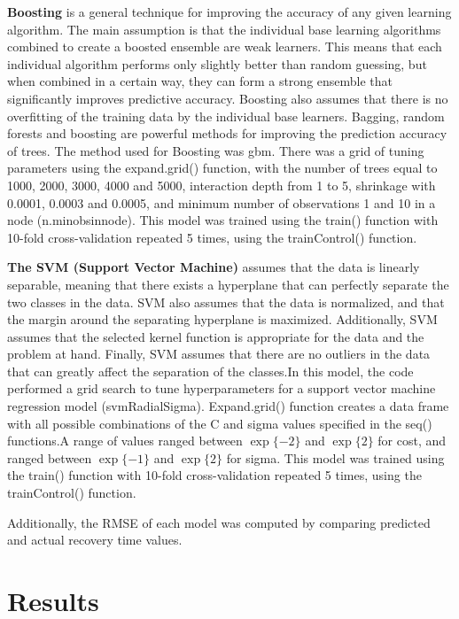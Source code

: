 \documentclass[
]{article}
\begin{document}
\textbf{Boosting} is a general technique for improving the accuracy of
any given learning algorithm. The main assumption is that the individual
base learning algorithms combined to create a boosted ensemble are weak
learners. This means that each individual algorithm performs only
slightly better than random guessing, but when combined in a certain
way, they can form a strong ensemble that significantly improves
predictive accuracy. Boosting also assumes that there is no overfitting
of the training data by the individual base learners. Bagging, random
forests and boosting are powerful methods for improving the prediction
accuracy of trees. The method used for Boosting was gbm. There was a
grid of tuning parameters using the expand.grid() function, with the
number of trees equal to 1000, 2000, 3000, 4000 and 5000, interaction
depth from 1 to 5, shrinkage with 0.0001, 0.0003 and 0.0005, and minimum
number of observations 1 and 10 in a node (n.minobsinnode). This model
was trained using the train() function with 10-fold cross-validation
repeated 5 times, using the trainControl() function.

\textbf{The SVM (Support Vector Machine)} assumes that the data is
linearly separable, meaning that there exists a hyperplane that can
perfectly separate the two classes in the data. SVM also assumes that
the data is normalized, and that the margin around the separating
hyperplane is maximized. Additionally, SVM assumes that the selected
kernel function is appropriate for the data and the problem at hand.
Finally, SVM assumes that there are no outliers in the data that can
greatly affect the separation of the classes.In this model, the code
performed a grid search to tune hyperparameters for a support vector
machine regression model (svmRadialSigma). Expand.grid() function
creates a data frame with all possible combinations of the C and sigma
values specified in the seq() functions.A range of values ranged between
\(\exp\{-2\}\) and \(\exp\{2\}\) for cost, and ranged between
\(\exp\{-1\}\) and \(\exp\{2\}\) for sigma. This model was trained using
the train() function with 10-fold cross-validation repeated 5 times,
using the trainControl() function.

Additionally, the RMSE of each model was computed by comparing predicted
and actual recovery time values.

\hypertarget{results}{%
\section{Results}\label{results}}
\end{document}
